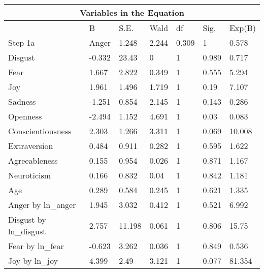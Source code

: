 \documentclass{llncs}
\begin{document}
\begin{table}[!ht]
\centering
\begin{tabular}{@{}lllllll@{}}
\toprule
\multicolumn{7}{c}{\textbf{Variables in the Equation}}                                          \\ \midrule
                                           & B      & S.E.   & Wald  & df    & Sig.  & Exp(B)   \\
Step 1a                                    & Anger  & 1.248  & 2.244 & 0.309 & 1     & 0.578    \\
Disgust                                    & -0.332 & 23.43  & 0     & 1     & 0.989 & 0.717    \\
Fear                                       & 1.667  & 2.822  & 0.349 & 1     & 0.555 & 5.294    \\
Joy                                        & 1.961  & 1.496  & 1.719 & 1     & 0.19  & 7.107    \\
Sadness                                    & -1.251 & 0.854  & 2.145 & 1     & 0.143 & 0.286    \\
Openness                                   & -2.494 & 1.152  & 4.691 & 1     & 0.03  & 0.083    \\
Conscientiousness                          & 2.303  & 1.266  & 3.311 & 1     & 0.069 & 10.008   \\
Extraversion                               & 0.484  & 0.911  & 0.282 & 1     & 0.595 & 1.622    \\
Agreeableness                              & 0.155  & 0.954  & 0.026 & 1     & 0.871 & 1.167    \\
Neuroticism                                & 0.166  & 0.832  & 0.04  & 1     & 0.842 & 1.181    \\
Age                                        & 0.289  & 0.584  & 0.245 & 1     & 0.621 & 1.335    \\
Anger by ln\_anger                         & 1.945  & 3.032  & 0.412 & 1     & 0.521 & 6.992    \\
Disgust by ln\_disgust                     & 2.757  & 11.198 & 0.061 & 1     & 0.806 & 15.75    \\
Fear by ln\_fear                           & -0.623 & 3.262  & 0.036 & 1     & 0.849 & 0.536    \\
Joy by ln\_joy                             & 4.399  & 2.49   & 3.121 & 1     & 0.077 & 81.354   \\

\end{tabular}
\end{table}
\end{document}

